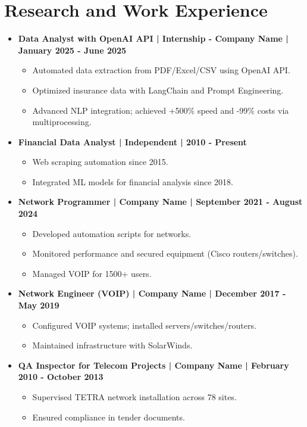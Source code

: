 \documentclass[11pt,a4paper]{article}
\begin{document}
\section*{Research and Work Experience}
\begin{itemize}
  \item \textbf{Data Analyst with OpenAI API | Internship - Company Name | January 2025 - June 2025}
    \begin{itemize}
    \item Automated data extraction from PDF/Excel/CSV using OpenAI API.
    \item Optimized insurance data with LangChain and Prompt Engineering.
    \item Advanced NLP integration; achieved +500\% speed and -99\% costs via multiprocessing.
    \end{itemize}
  \item \textbf{Financial Data Analyst | Independent | 2010 - Present}
    \begin{itemize}
    \item Web scraping automation since 2015.
    \item Integrated ML models for financial analysis since 2018.
    \end{itemize}
  \item \textbf{Network Programmer | Company Name | September 2021 - August 2024}
    \begin{itemize}
    \item Developed automation scripts for networks.
    \item Monitored performance and secured equipment (Cisco routers/switches).
    \item Managed VOIP for 1500+ users.
    \end{itemize}
  \item \textbf{Network Engineer (VOIP) | Company Name | December 2017 - May 2019}
    \begin{itemize}
    \item Configured VOIP systems; installed servers/switches/routers.
    \item Maintained infrastructure with SolarWinds.
    \end{itemize}
  \item \textbf{QA Inspector for Telecom Projects | Company Name | February 2010 - October 2013}
    \begin{itemize}
    \item Supervised TETRA network installation across 78 sites.
    \item Ensured compliance in tender documents.
    \end{itemize}
\end{itemize}
\end{document}
